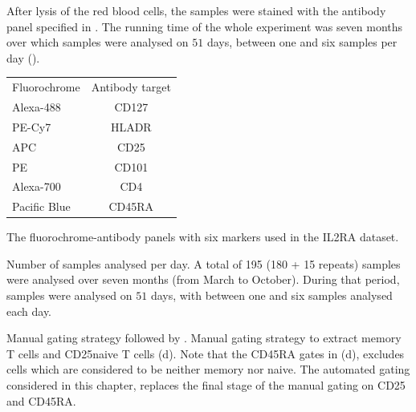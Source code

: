 After lysis of the red blood cells, the samples were stained with the antibody panel specified in .  
The running time of the whole experiment was seven months over which samples were analysed on $51$ days,
between one and six samples per day ().  


\begin{table}[h]
\centering
\begin{tabular}{lc}
\rowcolor{Gray}
Fluorochrome  & Antibody target\\
Alexa-488    & CD127\\
PE-Cy7       & HLADR\\
APC          & CD25\\
PE           & CD101\\
Alexa-700    & CD4\\
Pacific Blue & CD45RA\\
\end{tabular}
{ The fluorochrome-antibody panels with six markers used in the IL2RA dataset.  }
{ }
\end{table}


{Number of samples analysed per day.}
{
A total of 195 (180 + 15 repeats) samples were analysed over seven months (from March to October).
During that period, samples were analysed on $51$ days,
with between one and six samples analysed each day.
}


{Manual gating strategy followed by \citet{Dendrou:2009dv}.}
{
Manual gating strategy to extract memory T cells and CD25\positive naive T cells (d).
Note that the CD45RA gates in (d), excludes cells which are considered to be neither memory nor naive.
The automated gating considered in this chapter, replaces the final stage of the manual gating on CD25 and CD45RA.
}

